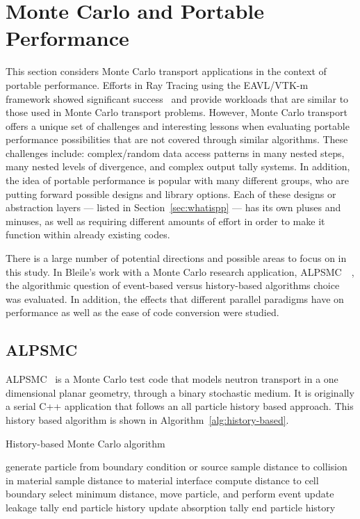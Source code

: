 \section{\textbf{Monte Carlo and Portable Performance}}

This section considers Monte Carlo transport applications in the context of portable performance.
%
Efforts in Ray Tracing using the EAVL/VTK-m framework showed significant success~\cite{larsen2015ray} and provide workloads that are similar to those used in Monte Carlo transport problems.
%
However, Monte Carlo transport offers a unique set of challenges and interesting lessons when evaluating portable performance possibilities that are not covered through similar algorithms.
%
These challenges include: complex/random data access patterns in many nested steps, many nested levels of divergence, and complex output tally systems.
%
In addition, the idea of portable performance is popular with many different groups, who are putting forward possible designs and library options.
%
Each of these designs or abstraction layers --- listed in Section~\ref{sec:whatispp} --- has its own pluses and minuses, as well as requiring different amounts of effort in order to make it function within already existing codes.
%

%
There is a large number of potential directions and possible areas to focus on in this study.
%
In Bleile's work with a Monte Carlo research application, ALPSMC~\cite{alpsmc1}~\cite{alpsmc2}, the algorithmic question of event-based versus history-based algorithms choice was evaluated.
%
In addition, the effects that different parallel paradigms have on performance as well as the ease of code conversion were studied.
%

\subsection{\textbf{ALPSMC}}

ALPSMC~\cite{brantley2011benchmark} is a Monte Carlo test code that models neutron transport in a one dimensional planar geometry, through a binary stochastic medium.
%
It is originally a serial C++ application that follows an all particle history based approach.
%
This history based algorithm is shown in Algorithm~\ref{alg:history-based}.
%

\begin{algorithm}
\DontPrintSemicolon
\caption{History-based Monte Carlo algorithm}
\label{alg:history-based}
{ 
    generate particle from boundary condition or source\;
    {
       sample distance to collision in material\;
       sample distance to material interface\;
       compute distance to cell boundary\;
       select minimum distance, move particle, and perform event\;
       {
          update leakage tally\;
          end particle history\;
       }
       {
          update absorption tally\;
          end particle history\;
       }
    }
}
\end{algorithm}
%

